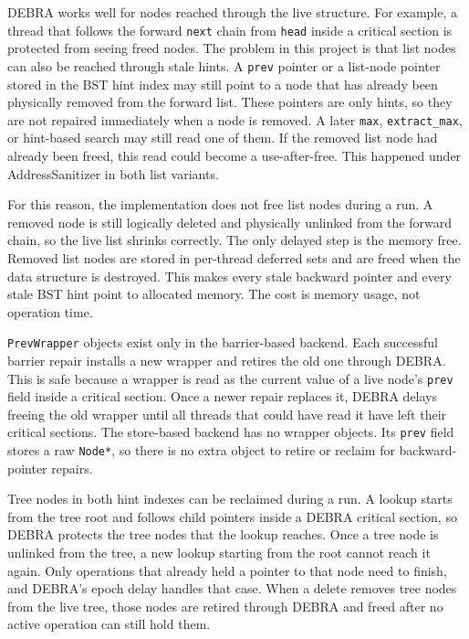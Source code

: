 \documentclass[a4paper,11pt]{article}
\newcommand{\code}[1]{\texttt{#1}}
\begin{document}
DEBRA works well for nodes reached through the live structure. For example, a thread that follows the forward \code{next} chain from \code{head} inside a critical section is protected from seeing freed nodes. The problem in this project is that list nodes can also be reached through stale hints. A \code{prev} pointer or a list-node pointer stored in the BST hint index may still point to a node that has already been physically removed from the forward list. These pointers are only hints, so they are not repaired immediately when a node is removed. A later \code{max}, \code{extract\_max}, or hint-based search may still read one of them. If the removed list node had already been freed, this read could become a use-after-free. This happened under AddressSanitizer in both list variants.

For this reason, the implementation does not free list nodes during a run. A removed node is still logically deleted and physically unlinked from the forward chain, so the live list shrinks correctly. The only delayed step is the memory free. Removed list nodes are stored in per-thread deferred sets and are freed when the data structure is destroyed. This makes every stale backward pointer and every stale BST hint point to allocated memory. The cost is memory usage, not operation time.

\code{PrevWrapper} objects exist only in the barrier-based backend. Each successful barrier repair installs a new wrapper and retires the old one through DEBRA. This is safe because a wrapper is read as the current value of a live node's \code{prev} field inside a critical section. Once a newer repair replaces it, DEBRA delays freeing the old wrapper until all threads that could have read it have left their critical sections. The store-based backend has no wrapper objects. Its \code{prev} field stores a raw \code{Node*}, so there is no extra object to retire or reclaim for backward-pointer repairs.

Tree nodes in both hint indexes can be reclaimed during a run. A lookup starts from the tree root and follows child pointers inside a DEBRA critical section, so DEBRA protects the tree nodes that the lookup reaches. Once a tree node is unlinked from the tree, a new lookup starting from the root cannot reach it again. Only operations that already held a pointer to that node need to finish, and DEBRA's epoch delay handles that case. When a delete removes tree nodes from the live tree, those nodes are retired through DEBRA and freed after no active operation can still hold them.
\end{document}
